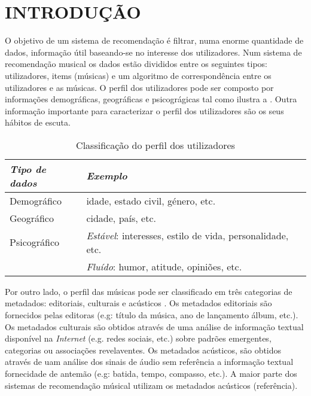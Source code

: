 \section{INTRODUÇÃO}
\label{sec:4introducao}

O objetivo de um sistema de recomendação é filtrar, numa enorme quantidade de dados, informação útil baseando-se no interesse dos utilizadores.
Num sistema de recomendação musical os dados estão divididos entre os seguintes tipos: utilizadores, items (músicas) e um algoritmo de 
correspondência entre os utilizadores e as músicas. O perfil dos utilizadores pode ser composto por informações demográficas, geográficas e psicográgicas 
\citep{celma2010music} tal como ilustra a . Outra informação importante para caracterizar o perfil dos utilizadores são os seus
hábitos de escuta.

\begin{table}[H]
    \begin{tabular}{ll}
    \toprule
	\emph{Tipo de dados}		& \emph{Exemplo} \\ 
	\midrule %
    Demográfico			& idade, estado civil, género, etc.\\
	Geográfico			& cidade, país, etc.\\ 
    Psicográfico		& \emph{Estável}: interesses, estilo de vida, personalidade, etc. \\
    					& \emph{Fluído}: humor, atitude, opiniões, etc.\\
	\bottomrule %
    \end{tabular} %
    \centering
    \caption{Classificação do perfil dos utilizadores}
    \label{Tabela411}
\end{table}

Por outro lado, o perfil das músicas pode ser classificado em três categorias de metadados: editoriais, culturais e acústicos 
\citep{Pachet_inencyclopedia}. Os metadados editoriais são fornecidos pelas editoras (e.g: título da música, ano de lançamento álbum, etc.). 
Os metadados culturais são obtidos através de uma análise de informação textual disponível na \emph{Internet} (e.g. 
redes sociais, etc.) sobre padrões emergentes, categorias ou associações revelaventes. Os metadados acústicos, são obtidos através de uam análise
dos sinais de áudio sem referência a informação textual fornecidade de antemão (e.g: batida, tempo, compasso, etc.). A maior parte dos sistemas de
recomendação músical utilizam os metadados acústicos (referência).

